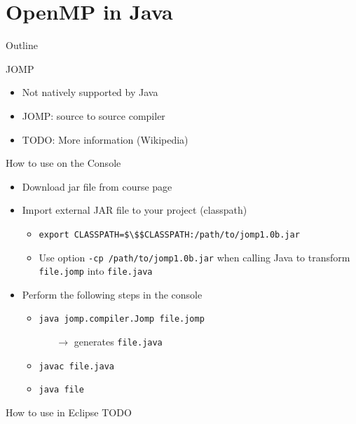 \section{OpenMP in Java}

\begin{frame}{Outline}
  \tableofcontents[current]
\end{frame}

\begin{frame}{JOMP}
  \begin{itemize}
  \item Not natively supported by Java
  \item JOMP: source to source compiler
  \item TODO: More information (Wikipedia)
  \end{itemize}
\end{frame}

\begin{frame}{How to use on the Console}
  \begin{itemize}
  \item Download jar file from course page
  \item Import external JAR file to your project (classpath)
    \begin{itemize}
    \item \lstinline!export CLASSPATH=$\$$CLASSPATH:/path/to/jomp1.0b.jar!
    \item Use option \lstinline!-cp /path/to/jomp1.0b.jar! when
      calling Java to transform \lstinline!file.jomp! into
      \lstinline!file.java!
    \end{itemize}
  \item Perform the following steps in the console
    \begin{itemize}
    \item \lstinline!java jomp.compiler.Jomp file.jomp!
      \begin{itemize}
      \item[$\rightarrow$] generates \lstinline!file.java!
      \end{itemize}
    \item \lstinline!javac file.java!
    \item \lstinline!java file!
    \end{itemize}
  \end{itemize}
\end{frame}

\begin{frame}{How to use in Eclipse}
  TODO
\end{frame}


